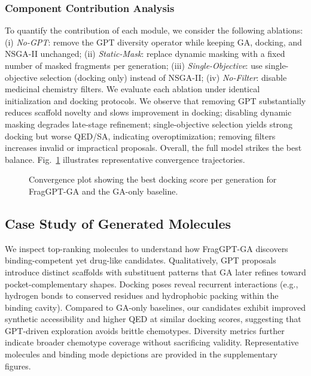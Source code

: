 \documentclass[letterpaper,journal]{IEEEtran}
\begin{document}
\subsubsection{Component Contribution Analysis}
To quantify the contribution of each module, we consider the following ablations: (i) \textit{No-GPT}: remove the GPT diversity operator while keeping GA, docking, and NSGA-II unchanged; (ii) \textit{Static-Mask}: replace dynamic masking with a fixed number of masked fragments per generation; (iii) \textit{Single-Objective}: use single-objective selection (docking only) instead of NSGA-II; (iv) \textit{No-Filter}: disable medicinal chemistry filters. We evaluate each ablation under identical initialization and docking protocols. We observe that removing GPT substantially reduces scaffold novelty and slows improvement in docking; disabling dynamic masking degrades late-stage refinement; single-objective selection yields strong docking but worse QED/SA, indicating overoptimization; removing filters increases invalid or impractical proposals. Overall, the full model strikes the best balance. Fig.~\ref{fig:convergence} illustrates representative convergence trajectories.
\begin{figure}[!t]
\centering
\caption{Convergence plot showing the best docking score per generation for FragGPT-GA and the GA-only baseline.}
\label{fig:convergence}
\end{figure}
\subsection{Case Study of Generated Molecules}
We inspect top-ranking molecules to understand how FragGPT-GA discovers binding-competent yet drug-like candidates. Qualitatively, GPT proposals introduce distinct scaffolds with substituent patterns that GA later refines toward pocket-complementary shapes. Docking poses reveal recurrent interactions (e.g., hydrogen bonds to conserved residues and hydrophobic packing within the binding cavity). Compared to GA-only baselines, our candidates exhibit improved synthetic accessibility and higher QED at similar docking scores, suggesting that GPT-driven exploration avoids brittle chemotypes. Diversity metrics further indicate broader chemotype coverage without sacrificing validity. Representative molecules and binding mode depictions are provided in the supplementary figures.
\end{document}
